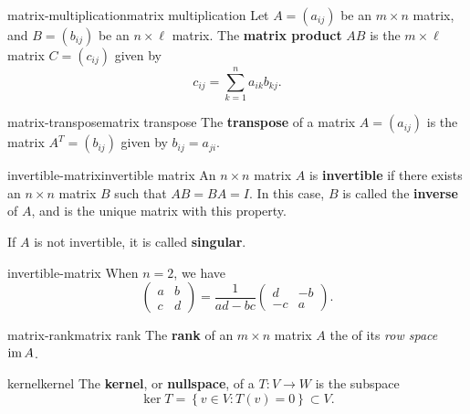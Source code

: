 \begin{topic}{matrix-multiplication}{matrix multiplication}
    Let $A = (a_{ij})$ be an $m \times n$ matrix, and $B = (b_{ij})$ be an $n \times \ell$ matrix. The \textbf{matrix product} $AB$ is the $m \times \ell$ matrix $C = (c_{ij})$ given by
    \[  c_{ij} = \sum_{k = 1}^{n} a_{ik} b_{kj} . \]
\end{topic}

\begin{topic}{matrix-transpose}{matrix transpose}
    The \textbf{transpose} of a matrix $A = (a_{ij})$ is the matrix $A^T = (b_{ij})$ given by $b_{ij} = a_{ji}$.
\end{topic}

    

\begin{topic}{invertible-matrix}{invertible matrix}
    An $n \times n$ matrix $A$ is \textbf{invertible} if there exists an $n \times n$ matrix $B$ such that $AB = BA = I$. In this case, $B$ is called the \textbf{inverse} of $A$, and is the unique matrix with this property.
    
    If $A$ is not invertible, it is called \textbf{singular}.
\end{topic}

\begin{example}{invertible-matrix}
    When $n = 2$, we have
    \[ \begin{pmatrix} a & b \\ c & d \end{pmatrix} = \frac{1}{ad - bc} \begin{pmatrix} d & -b \\ -c & a \end{pmatrix} . \]
\end{example}

\begin{topic}{matrix-rank}{matrix rank}
    The \textbf{rank} of an $m \times n$ matrix $A$ the  of its \textit{row space} $\operatorname{im} A$.
\end{topic}

\begin{topic}{kernel}{kernel}
    The \textbf{kernel}, or \textbf{nullspace}, of a  $T : V \to W$ is the subspace
    \[ \ker T = \left\{ v \in V : T(v) = 0 \right\} \subset V . \]
\end{topic}

